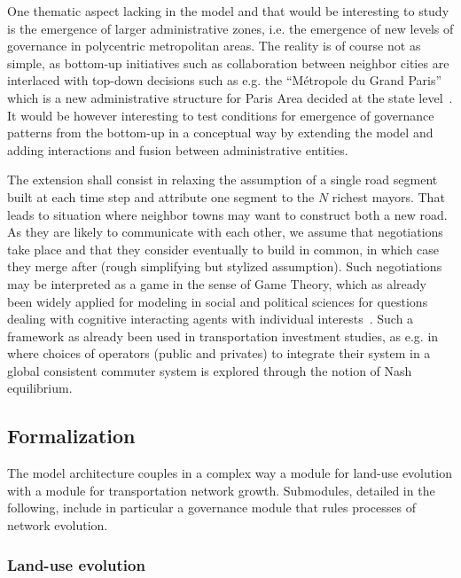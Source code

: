 One thematic aspect lacking in the model and that would be interesting to study is the emergence of larger administrative zones, i.e. the emergence of new levels of governance in polycentric metropolitan areas. The reality is of course not as simple, as bottom-up initiatives such as collaboration between neighbor cities are interlaced with top-down decisions such as e.g. the ``M{\'e}tropole du Grand Paris'' which is a new administrative structure for Paris Area decided at the state level~\cite{gilli2009paris}. It would be however interesting to test conditions for emergence of governance patterns from the bottom-up in a conceptual way by extending the model and adding interactions and fusion between administrative entities.

The extension shall consist in relaxing the assumption of a single road segment built at each time step and attribute one segment to the $N$ richest mayors. That leads to situation where neighbor towns may want to construct both a new road. As they are likely to communicate with each other, we assume that negotiations take place and that they consider eventually to build in common, in which case they merge after (rough simplifying but stylized assumption). Such negotiations may be interpreted as a game in the sense of Game Theory, which as already been widely applied for modeling in social and political sciences for questions dealing with cognitive interacting agents with individual interests~\cite{ordeshook1986game}. Such a framework as already been used in transportation investment studies, as e.g. in~\cite{Roumboutsos2008209} where choices of operators (public and privates) to integrate their system in a global consistent commuter system is explored through the notion of Nash equilibrium.




\subsection{Formalization}


The model architecture couples in a complex way a module for land-use evolution with a module for transportation network growth. Submodules, detailed in the following, include in particular a governance module that rules processes of network evolution.


\subsubsection{Land-use evolution}




